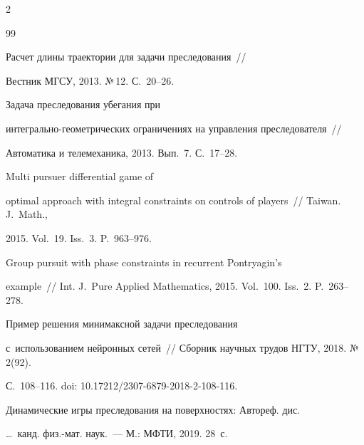 \begin{multicols}{2}
{{\begin{thebibliography}{99}


 Расчет длины траектории для задачи преследования~// 


Вестник МГСУ, 2013. №\,12. С.~20--26.




 Задача преследования убегания при  


ин\-тег\-раль\-но-гео\-мет\-ри\-че\-ских ограничениях на управ\-ле\-ния преследователя~// 


Автоматика и телемеханика, 2013. Вып.~7. С.~17--28.







 Multi pursuer differential game of 


optimal approach with integral constraints on controls of players~// Taiwan. J.~Math., 


2015. Vol.~19. Iss.~3. P.~963--976.




 Group pursuit with phase constraints in recurrent Pontryagin's 


example~// Int. J.~Pure Applied Mathematics, 2015. Vol.~100. Iss.~2. P.~263--278.







 Пример решения минимаксной задачи преследования 


с~использованием нейронных сетей~// Сборник научных трудов НГТУ, 2018. №\,2(92). 


С.~108--116. doi: 10.17212/2307-6879-2018-2-108-116.




 Динамические игры преследования на поверхностях: Автореф. дис.\ 


\ldots\ канд. физ.-мат. наук.~--- М.: МФТИ, 2019. 28~с.








\end{thebibliography}





 }


 }





\end{multicols}





